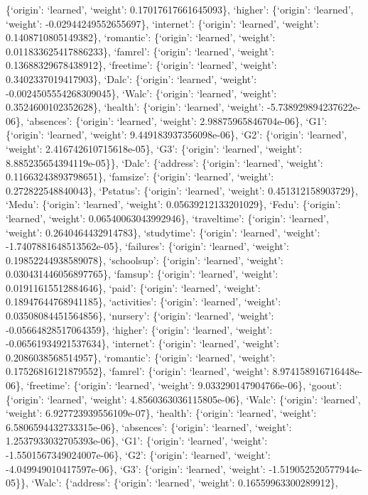 \documentclass[
]{article}
\begin{document}
\{`origin': `learned', `weight': 0.17017617661645093\}, `higher':
\{`origin': `learned', `weight': -0.02944249552655697\}, `internet':
\{`origin': `learned', `weight': 0.1408710805149382\}, `romantic':
\{`origin': `learned', `weight': 0.011833625417886233\}, `famrel':
\{`origin': `learned', `weight': 0.13688329678438912\}, `freetime':
\{`origin': `learned', `weight': 0.3402337019417903\}, `Dalc':
\{`origin': `learned', `weight': -0.0024505554268309045\}, `Walc':
\{`origin': `learned', `weight': 0.3524600102352628\}, `health':
\{`origin': `learned', `weight': -5.738929894237622e-06\}, `absences':
\{`origin': `learned', `weight': 2.98875965846704e-06\}, `G1':
\{`origin': `learned', `weight': 9.449183937356098e-06\}, `G2':
\{`origin': `learned', `weight': 2.416742610715618e-05\}, `G3':
\{`origin': `learned', `weight': 8.885235654394119e-05\}\}, `Dalc':
\{`address': \{`origin': `learned', `weight': 0.11663243893798651\},
`famsize': \{`origin': `learned', `weight': 0.272822548840043\},
`Pstatus': \{`origin': `learned', `weight': 0.451312158903729\}, `Medu':
\{`origin': `learned', `weight': 0.05639212133201029\}, `Fedu':
\{`origin': `learned', `weight': 0.06540063043992946\}, `traveltime':
\{`origin': `learned', `weight': 0.2640464432914783\}, `studytime':
\{`origin': `learned', `weight': -1.7407881648513562e-05\}, `failures':
\{`origin': `learned', `weight': 0.19852244938589078\}, `schoolsup':
\{`origin': `learned', `weight': 0.030431446056897765\}, `famsup':
\{`origin': `learned', `weight': 0.01911615512884646\}, `paid':
\{`origin': `learned', `weight': 0.18947644768941185\}, `activities':
\{`origin': `learned', `weight': 0.03508084451564856\}, `nursery':
\{`origin': `learned', `weight': -0.05664828517064359\}, `higher':
\{`origin': `learned', `weight': -0.06561934921537634\}, `internet':
\{`origin': `learned', `weight': 0.2086038568514957\}, `romantic':
\{`origin': `learned', `weight': 0.17526816121879552\}, `famrel':
\{`origin': `learned', `weight': 8.974158916716448e-06\}, `freetime':
\{`origin': `learned', `weight': 9.033290147904766e-06\}, `goout':
\{`origin': `learned', `weight': 4.8560363036115805e-06\}, `Walc':
\{`origin': `learned', `weight': 6.927723939556109e-07\}, `health':
\{`origin': `learned', `weight': 6.5806594432733315e-06\}, `absences':
\{`origin': `learned', `weight': 1.2537933032705393e-06\}, `G1':
\{`origin': `learned', `weight': -1.5501567349024007e-06\}, `G2':
\{`origin': `learned', `weight': -4.049949010417597e-06\}, `G3':
\{`origin': `learned', `weight': -1.519052520577944e-05\}\}, `Walc':
\{`address': \{`origin': `learned', `weight': 0.16559963300289912\},
\end{document}
